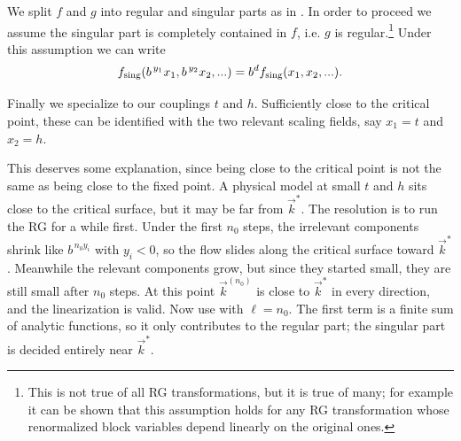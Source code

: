 We split $f$ and $g$ into regular and singular parts as in
. In order to proceed we 
assume the singular part is completely contained in
$f$, i.e. $g$ is regular.\footnote{This is not true of all RG transformations, but it is true
of many; for example it can be shown that this assumption holds for any
RG transformation whose renormalized block variables depend linearly
on the original ones.} Under this assumption we can write
\begin{equation}\label{eq:fsingHomogeneity}
  f_{\text{sing}}(b^{\,y_1}x_1,b^{\,y_2}x_2,...)=b^df_{\text{sing}}(x_1,x_2,...).
\end{equation}

Finally we specialize to our couplings $t$ and $h$. Sufficiently close to the
critical point, these can be identified with the two relevant scaling fields,
say $x_1=t$ and $x_2=h$.

This deserves some explanation, since being close to the critical point is not
the same as being close to the fixed point. A physical model at small $t$ and $h$
sits close to the critical surface, but it may be far from $\vec{k}^*$. The resolution
is to run the RG for a while first. Under the first $n_0$ steps, the irrelevant
components shrink like $b^{\,n_0y_i}$ with $y_i<0$, so the flow slides along the
critical surface toward $\vec{k}^*$. Meanwhile the relevant components grow, but
since they started small, they are still small after $n_0$ steps. At this point
$\vec{k}^{(n_0)}$ is close to $\vec{k}^*$ in every direction, and the linearization
is valid. Now use  with $\ell=n_0$.
The first term is a finite sum of analytic functions, so it only contributes
to the regular part; the singular part is decided entirely near $\vec{k}^*$.

